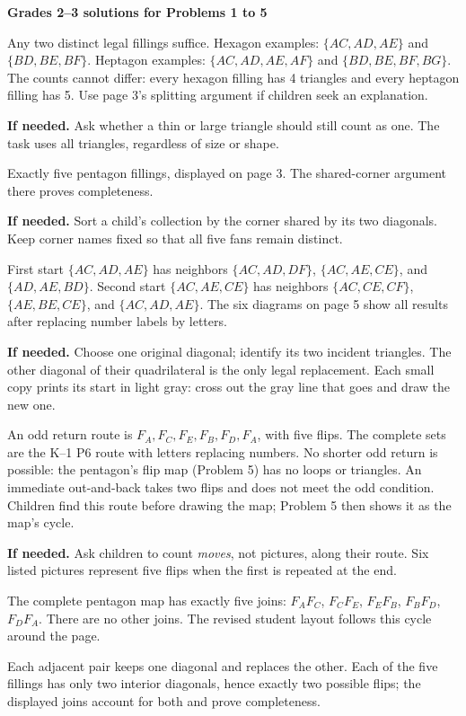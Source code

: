 \documentclass[11pt,letterpaper]{article}
\newcommand{\pagehead}[1]{{\Large\bfseries #1}\par\vspace{3pt}}
\newcommand{\prob}[2]{\par\vspace{5pt}{\large\bfseries #1}\par #2}
\newcommand{\hint}[1]{\par\textbf{If needed.} #1\par}
\begin{document}
\newpage
\pagehead{Grades 2--3 solutions for Problems 1 to 5}
\prob{Problem 1}{Any two distinct legal fillings suffice. Hexagon examples: $\{AC,AD,AE\}$ and $\{BD,BE,BF\}$. Heptagon examples: $\{AC,AD,AE,AF\}$ and $\{BD,BE,BF,BG\}$. The counts cannot differ: every hexagon filling has 4 triangles and every heptagon filling has 5. Use page 3's splitting argument if children seek an explanation.}
\hint{Ask whether a thin or large triangle should still count as one. The task uses all triangles, regardless of size or shape.}
\prob{Problem 2}{Exactly five pentagon fillings, displayed on page 3. The shared-corner argument there proves completeness.}
\hint{Sort a child's collection by the corner shared by its two diagonals. Keep corner names fixed so that all five fans remain distinct.}
\prob{Problem 3}{First start $\{AC,AD,AE\}$ has neighbors $\{AC,AD,DF\}$, $\{AC,AE,CE\}$, and $\{AD,AE,BD\}$. Second start $\{AC,AE,CE\}$ has neighbors $\{AC,CE,CF\}$, $\{AE,BE,CE\}$, and $\{AC,AD,AE\}$. The six diagrams on page 5 show all results after replacing number labels by letters.}
\hint{Choose one original diagonal; identify its two incident triangles. The other diagonal of their quadrilateral is the only legal replacement. Each small copy prints its start in light gray: cross out the gray line that goes and draw the new one.}
\prob{Problem 4}{An odd return route is $F_A,F_C,F_E,F_B,F_D,F_A$, with five flips. The complete sets are the K--1 P6 route with letters replacing numbers. No shorter odd return is possible: the pentagon's flip map (Problem 5) has no loops or triangles. An immediate out-and-back takes two flips and does not meet the odd condition. Children find this route before drawing the map; Problem 5 then shows it as the map's cycle.}
\hint{Ask children to count \emph{moves}, not pictures, along their route. Six listed pictures represent five flips when the first is repeated at the end.}
\prob{Problem 5}{The complete pentagon map has exactly five joins: $F_A F_C$, $F_C F_E$, $F_E F_B$, $F_B F_D$, $F_D F_A$. There are no other joins. The revised student layout follows this cycle around the page.}
\begin{center}
\end{center}
Each adjacent pair keeps one diagonal and replaces the other. Each of the five fillings has only two interior diagonals, hence exactly two possible flips; the displayed joins account for both and prove completeness.
\end{document}
